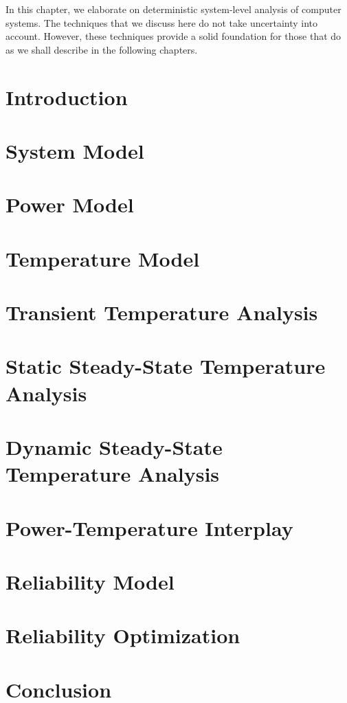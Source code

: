 In this chapter, we elaborate on deterministic system-level analysis of computer
systems. The techniques that we discuss here do not take uncertainty into
account. However, these techniques provide a solid foundation for those that do
as we shall describe in the following chapters.

\section{Introduction}

\section{System Model}

\section{Power Model}

\section{Temperature Model}

\section{Transient Temperature Analysis}

\section{Static Steady-State Temperature Analysis}

\section{Dynamic Steady-State Temperature Analysis}

\section{Power-Temperature Interplay}

\section{Reliability Model}

\section{Reliability Optimization}

\section{Conclusion}
